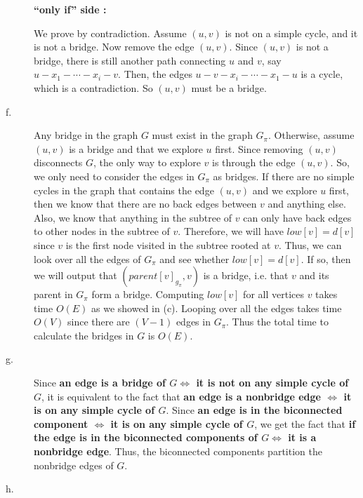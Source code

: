 \begin{description}
\textbf{``only if'' side :}

We prove by contradiction. Assume $(u, v)$ is not on a simple cycle, and it is not a bridge. Now remove the edge $(u, v)$. Since $(u, v)$ is not a bridge, there is still another path
connecting $u$ and $v$, say $u -x_1 -\cdots -x_i - v$. Then, the edges $u - v - x_i -\cdots-x_1 - u$ is a cycle, which is a contradiction. So $(u, v)$ must be a bridge.

\item[f. \hspace{9pt}] 

Any bridge in the graph $G$ must exist in the graph $G_\pi$. Otherwise, assume $(u, v)$ is a bridge and that we explore $u$ first. Since removing $(u, v)$ disconnects $G$, the only way to
explore $v$ is through the edge $(u, v)$. So, we only need to consider the edges in $G_\pi$ as bridges. If there are no simple cycles in the graph that contains the edge $(u, v)$ and we
explore $u$ first, then we know that there are no back edges between $v$ and anything else. Also, we know that anything in the subtree of $v$ can only have back edges to other nodes in 
the subtree of $v$. Therefore, we will have $low[v] = d[v]$ since $v$ is the first node visited in the subtree rooted at $v$. Thus, we can look over all the edges of $G_\pi$ and see
whether $low[v] = d[v]$. If so, then we will output that $(parent[v]_{g_\pi}, v)$ is a bridge, i.e. that $v$ and its parent in $G_\pi$ form a bridge. Computing $low[v]$ for all vertices
$v$ takes time $O(E)$ as we showed in (c). Looping over all the edges takes time $O(V)$ since there are $(V-1)$ edges in $G_\pi$. Thus the total time to calculate the bridges in $G$ is
$O(E)$.

\item[g. \hspace{9pt}]

Since \textbf{an edge is a bridge of $G \iff$  it is not on any simple cycle of $G$}, it is equivalent to the fact that \textbf{an edge is a nonbridge edge $\iff$ it is on any simple cycle of $G$}. Since
\textbf{an edge is in the biconnected component $\iff$ it is on any simple cycle of $G$}, we get the fact that \textbf{if the edge is in the biconnected components of $G \iff $ it is a nonbridge edge}.
Thus, the biconnected components partition the nonbridge edges of $G$.

\item[h. \hspace{9pt}]


\end{description}

